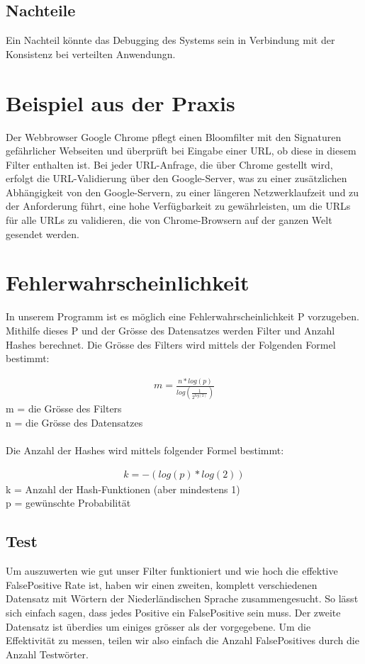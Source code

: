\documentclass[11pt]{article}
\begin{document}
    \subsection{Nachteile}
    Ein Nachteil k{\"o}nnte das Debugging des Systems sein in Verbindung mit der Konsistenz bei verteilten Anwendungn.

    \section{Beispiel aus der Praxis}
    Der Webbrowser Google Chrome pflegt einen Bloomfilter mit den Signaturen gef{\"a}hrlicher Webseiten und {\"u}berpr{\"u}ft bei Eingabe einer URL, ob diese in diesem Filter enthalten ist.
    Bei jeder URL-Anfrage, die {\"u}ber Chrome gestellt wird, erfolgt die URL-Validierung {\"u}ber den Google-Server, was zu einer zus{\"a}tzlichen Abh{\"a}ngigkeit von den Google-Servern, zu einer l{\"a}ngeren Netzwerklaufzeit und zu der Anforderung f{\"u}hrt, eine hohe Verf{\"u}gbarkeit zu gew{\"a}hrleisten, um die URLs f{\"u}r alle URLs zu validieren, die von Chrome-Browsern auf der ganzen Welt gesendet werden.

    \section{Fehlerwahrscheinlichkeit}
    In unserem Programm ist es m{\"o}glich eine Fehlerwahrscheinlichkeit P vorzugeben.
    Mithilfe dieses P und der Gr{\"o}sse des Datensatzes werden Filter und Anzahl Hashes berechnet.
    Die Gr{\"o}sse des Filters wird mittels der Folgenden Formel bestimmt:

     \begin{align*}
        m = \frac{n * log(p)}{log(\frac{1}{2^{log(2)}})}
    \end{align*}
    \smallskip
    m = die Gr{\"o}sse des Filters
    \\
    n = die Gr{\"o}sse des Datensatzes
    \\
    \\
    Die Anzahl der Hashes wird mittels folgender Formel bestimmt:

    \begin{align*}
        k = -(log(p) * log(2))
    \end{align*}
    \smallskip
    k = Anzahl der Hash-Funktionen (aber mindestens 1)
    \\
    p = gew{\"u}nschte Probabilit{\"a}t
    \medskip

    \subsection{Test}
    Um auszuwerten wie gut unser Filter funktioniert und wie hoch die effektive FalsePositive Rate ist,
    haben wir einen zweiten, komplett verschiedenen Datensatz mit W{\"o}rtern der Niederl{\"a}ndischen Sprache zusammengesucht.
    So l{\"a}sst sich einfach sagen, dass jedes Positive ein FalsePositive sein muss. Der zweite Datensatz ist {\"u}berdies um einiges
    gr{\"o}sser als der vorgegebene. Um die Effektivit{\"a}t zu messen, teilen wir also einfach die Anzahl FalsePositives durch die Anzahl
    Testw{\"o}rter.
\end{document}

